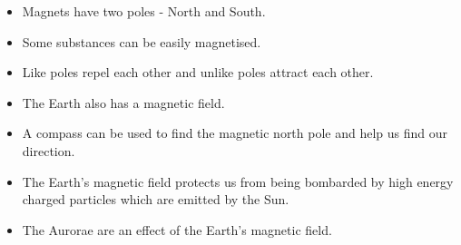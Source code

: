             \nopagebreak
      \label{m37830*id129673}\begin{itemize}[noitemsep] 
            \label{m37830*uid23}\item Magnets have two poles - North and South.
\label{m37830*uid24}\item Some substances can be easily magnetised.
\label{m37830*uid25}\item Like poles repel each other and unlike poles attract each other.
\label{m37830*uid26}\item The Earth also has a magnetic field.
\label{m37830*uid27}\item A compass can be used to find the magnetic north pole and help us find our direction.
\item The Earth's magnetic field protects us from being bombarded by high energy charged particles which are emitted by the Sun.
\item The Aurorae are an effect of the Earth's magnetic field. 
\end{itemize}
